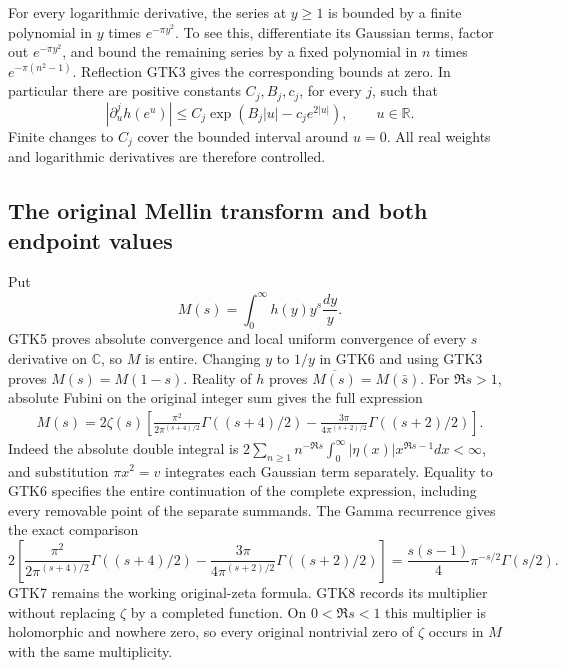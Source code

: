 For every logarithmic derivative, the series at $y\ge1$ is
bounded by a finite polynomial in $y$ times $e^{-\pi y^2}$.
To see this, differentiate its Gaussian terms, factor out
$e^{-\pi y^2}$, and bound the remaining series by a fixed
polynomial in $n$ times $e^{-\pi(n^2-1)}$. Reflection GTK3
gives the corresponding bounds at zero. In particular there
are positive constants $C_j,B_j,c_j$, for every $j$, such that
\begin{equation}\tag{GTK5}
 \left|\partial_u^j h(e^u)\right|
 \le C_j\exp(B_j|u|-c_j e^{2|u|}),\qquad u\in\mathbb R.
\end{equation}
Finite changes to $C_j$ cover the bounded interval around
$u=0$. All real weights and logarithmic derivatives are
therefore controlled.

\subsection{The original Mellin transform and both endpoint values}

Put
\begin{equation}\tag{GTK6}
 M(s)=\int_0^\infty h(y)y^s\frac{dy}{y}.
\end{equation}
GTK5 proves absolute convergence and local uniform convergence
of every $s$ derivative on $\mathbb C$, so $M$ is entire.
Changing $y$ to $1/y$ in GTK6 and using GTK3 proves
$M(s)=M(1-s)$. Reality of $h$ proves
$\overline{M(s)}=M(\bar s)$. For $\Re s>1$, absolute Fubini
on the original integer sum gives the full expression
\begin{equation}\tag{GTK7}
 \begin{split}
 M(s)=2\zeta(s)\left[
   \frac{\pi^2}{2\pi^{(s+4)/2}}\Gamma((s+4)/2)
  -\frac{3\pi}{4\pi^{(s+2)/2}}\Gamma((s+2)/2)\right].
 \end{split}
\end{equation}
Indeed the absolute double integral is
$2\sum_{n\ge1}n^{-\Re s}\int_0^\infty|\eta(x)|
x^{\Re s-1}dx<\infty$, and substitution $\pi x^2=v$
integrates each Gaussian term separately. Equality to GTK6
specifies the entire continuation of the complete expression,
including every removable point of the separate summands.
The Gamma recurrence gives the exact comparison
\begin{equation}\tag{GTK8}
 2\left[
   \frac{\pi^2}{2\pi^{(s+4)/2}}\Gamma((s+4)/2)
  -\frac{3\pi}{4\pi^{(s+2)/2}}\Gamma((s+2)/2)\right]
 =\frac{s(s-1)}4\pi^{-s/2}\Gamma(s/2).
\end{equation}
GTK7 remains the working original-zeta formula. GTK8 records
its multiplier without replacing $\zeta$ by a completed function.
On $0<\Re s<1$ this multiplier is holomorphic and nowhere zero,
so every original nontrivial zero of $\zeta$ occurs in $M$
with the same multiplicity.


